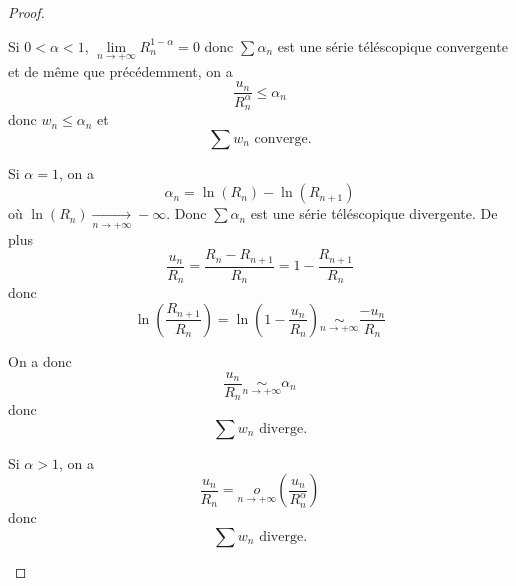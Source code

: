 \begin{proof}
\begin{enumerate}
		Si $0<\alpha<1$, $\lim\limits_{n\to+\infty}R_{n}^{1-\alpha}=0$ donc $\sum \alpha_{n}$ est une série téléscopique convergente et de même que précédemment, on a 
		$$\frac{u_{n}}{R_{n}^{\alpha}}\leqslant\alpha_{n}$$
		donc $w_{n}\leqslant \alpha_{n}$ et 
		$$\boxed{\sum w_{n}\text{ converge.}}$$

		Si $\alpha=1$, on a 
		$$\alpha_{n}=\ln(R_{n})-\ln(R_{n+1})$$
		où $\ln(R_{n})\xrightarrow[n\to+\infty]{}-\infty$. Donc $\sum \alpha_{n}$ est une série téléscopique divergente. De plus 
		$$\frac{u_{n}}{R_{n}}=\frac{R_{n}-R_{n+1}}{R_{n}}=1-\frac{R_{n+1}}{R_{n}}$$
		donc 
		$$\ln\left(\frac{R_{n+1}}{R_{n}}\right)=\ln\left(1-\frac{u_{n}}{R_{n}}\right)\underset{n\to+\infty}{\sim}\frac{-u_{n}}{R_{n}}$$

		On a donc $$\frac{u_{n}}{R_{n}}\underset{n\to+\infty}{\sim}\alpha_{n}$$
		donc 
		$$\boxed{\sum w_{n}\text{ diverge.}}$$

		Si $\alpha>1$, on a $$\frac{u_{n}}{R_{n}}=\underset{n\to+\infty}{o}\left(\frac{u_{n}}{R_{n}^{\alpha}}\right)$$
		donc 
		$$\boxed{\sum w_{n}\text{ diverge.}}$$
	\end{enumerate}
\end{proof}

